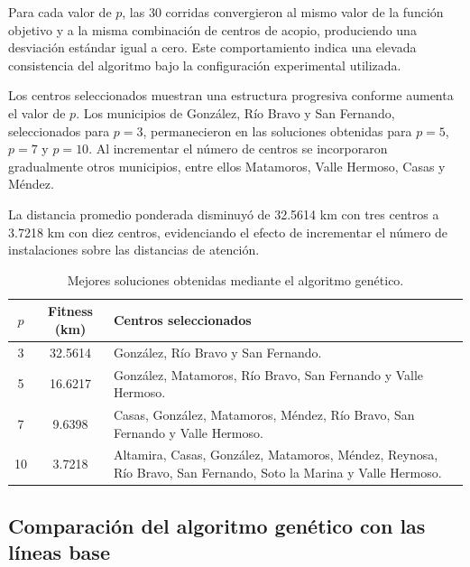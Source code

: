 \documentclass[journal]{IEEEtran}
\begin{document}
Para cada valor de $p$, las 30 corridas convergieron al mismo valor de la función objetivo y a la misma combinación de centros de acopio, produciendo una desviación estándar igual a cero. Este comportamiento indica una elevada consistencia del algoritmo bajo la configuración experimental utilizada.

Los centros seleccionados muestran una estructura progresiva conforme aumenta el valor de $p$. Los municipios de González, Río Bravo y San Fernando, seleccionados para $p=3$, permanecieron en las soluciones obtenidas para $p=5$, $p=7$ y $p=10$. Al incrementar el número de centros se incorporaron gradualmente otros municipios, entre ellos Matamoros, Valle Hermoso, Casas y Méndez.

La distancia promedio ponderada disminuyó de 32.5614 km con tres centros a 3.7218 km con diez centros, evidenciando el efecto de incrementar el número de instalaciones sobre las distancias de atención.

\begin{table}[!t]
	\centering
	\caption{Mejores soluciones obtenidas mediante el algoritmo genético.}
	\label{tab:centros_ga}
	\footnotesize
	\begin{tabular}{cc>{\raggedright\arraybackslash}p{4.2cm}}
		\toprule
		\textbf{$p$} &
		\textbf{Fitness (km)} &
		\textbf{Centros seleccionados} \\
		\midrule
		
		3 & 32.5614 &
		González, Río Bravo y San Fernando. \\
		
		5 & 16.6217 &
		González, Matamoros, Río Bravo, San Fernando y Valle Hermoso. \\
		
		7 & 9.6398 &
		Casas, González, Matamoros, Méndez, Río Bravo, San Fernando y Valle Hermoso. \\
		
		10 & 3.7218 &
		Altamira, Casas, González, Matamoros, Méndez, Reynosa, Río Bravo, San Fernando, Soto la Marina y Valle Hermoso. \\
		
		\bottomrule
	\end{tabular}
\end{table}

\subsection{Comparación del algoritmo genético con las líneas base}
\end{document}

